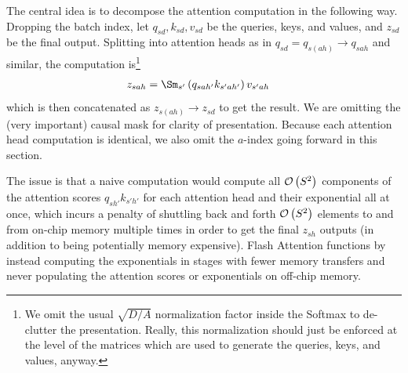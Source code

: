 \documentclass[11pt]{article}
\begin{document}
The central idea is to decompose the attention computation in the following way. Dropping the batch
index, let $ q _{ sd }, k _{ sd }, v _{ sd } $ be the queries, keys, and values, and $ z _{ sd } $
be the final output. Splitting into attention heads as in $ q _{ sd } = q _{ s(ah) }\longrightarrow
q _{ sah } $ and similar, the computation is\footnote{We omit the usual $ \sqrt{D/A} $ normalization
factor inside the Softmax to de-clutter the presentation. Really, this normalization should just be
enforced at the level of the matrices which are used to generate the queries, keys, and values,
anyway.}
\begin{align}
    z _{ sah } &= \Sm _{ s' } \left ( q _{ sah' } k _{ s'ah' }   \right ) v _{ s'ah }
\end{align}
which is then concatenated as $ z _{ s(ah) }\longrightarrow  z _{ sd } $ to get the result. We are
omitting the (very important) causal mask for clarity of presentation.  Because each attention head
computation is identical, we also omit the $ a $-index going forward in this section.

The issue is that a naive computation would compute all $ \mathcal{O} \left( S ^{ 2 } \right)  $
components of the attention scores $ q _{ sh' } k _{ s'h' } $ for each attention head and their
exponential all at once, which incurs a penalty of shuttling back and forth $ \mathcal{O} \left( S ^{ 2 }
\right)  $ elements to and from on-chip memory multiple times in order to get the final $ z _{ sh }
$ outputs (in addition to being potentially memory expensive). Flash Attention functions by instead
computing the exponentials in stages with fewer memory transfers and never populating the attention
scores or exponentials on off-chip memory.
\end{document}
